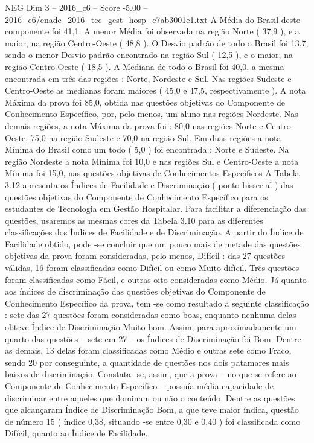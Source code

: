 \begin{textsample}{NEG Dim 3 – 2016\_c6 – Score -5.00 – 2016\_c6/enade\_2016\_tec\_gest\_hosp\_c7ab3001e1.txt}
A Média do Brasil deste componente foi 41,1.
A menor Média foi observada na região Norte ( 37,9 ), e a maior, na região Centro-Oeste ( 48,8 ).
O Desvio padrão de todo o Brasil foi 13,7, sendo o menor Desvio padrão encontrado na região Sul ( 12,5 ), e o maior, na região Centro-Oeste ( 18,5 ).
A Mediana de todo o Brasil foi 40,0, a mesma encontrada em três das regiões : Norte, Nordeste e Sul.
Nas regiões Sudeste e Centro-Oeste as medianas foram maiores ( 45,0 e 47,5, respectivamente ).
A nota Máxima da prova foi 85,0, obtida nas questões objetivas do Componente de Conhecimento Específico, por, pelo menos, um aluno nas regiões Nordeste.
Nas demais regiões, a nota Máxima da prova foi : 80,0 nas regiões Norte e Centro-Oeste, 75,0 na região Sudeste e 70,0 na região Sul.
Em duas regiões a nota Mínima do Brasil como um todo ( 5,0 ) foi encontrada : Norte e Sudeste.
Na região Nordeste a nota Mínima foi 10,0 e nas regiões Sul e Centro-Oeste a nota Mínima foi 15,0, nas questões objetivas de Conhecimentos Específicos A Tabela 3.12 apresenta os Índices de Facilidade e Discriminação ( ponto-bisserial ) das questões objetivas do Componente de Conhecimento Específico para os estudantes de Tecnologia em Gestão Hospitalar.
Para facilitar a diferenciação das questões, usaremos as mesmas cores da Tabela 3.10 para as diferentes classificações dos Índices de Facilidade e de Discriminação.
A partir do Índice de Facilidade obtido, pode -se concluir que um pouco mais de metade das questões objetivas da prova foram consideradas, pelo menos, Difícil : das 27 questões válidas, 16 foram classificadas como Difícil ou como Muito difícil.
Três questões foram classificadas como Fácil, e outras oito consideradas como Médio.
Já quanto aos índices de discriminação das questões objetivas do Componente de Conhecimento Específico da prova, tem -se como resultado a seguinte classificação : sete das 27 questões foram consideradas como boas, enquanto nenhuma delas obteve Índice de Discriminação Muito bom.
Assim, para aproximadamente um quarto das questões – sete em 27 – os Índices de Discriminação foi Bom.
Dentre as demais, 13 delas foram classificadas como Médio e outras sete como Fraco, sendo 20 por conseguinte, a quantidade de questões nos dois patamares mais baixos de discriminação.
Constata -se, assim, que a prova – no que se refere ao Componente de Conhecimento Específico – possuía média capacidade de discriminar entre aqueles que dominam ou não o conteúdo.
Dentre as questões que alcançaram Índice de Discriminação Bom, a que teve maior índica, questão de número 15 ( índice 0,38, situando -se entre 0,30 e 0,40 ) foi classificada como Difícil, quanto ao Índice de Facilidade.

\end{textsample}
